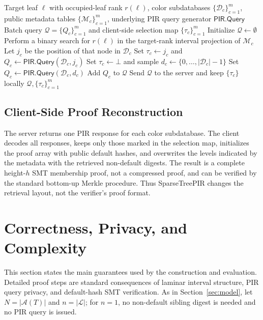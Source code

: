\begin{algorithm}[H]
\caption{Online query generation: one PIR subquery per color}
\label{alg:query}
\begin{algorithmic}[1]
\Require Target leaf $\ell$ with occupied-leaf rank $r(\ell)$, color subdatabases $\{\mathcal{D}_c\}_{c=1}^{m}$, public metadata tables $\{\mathcal{M}_c\}_{c=1}^{m}$, underlying PIR query generator $\mathsf{PIR.Query}$
\Ensure Batch query $\mathcal{Q}=\{Q_c\}_{c=1}^{m}$ and client-side selection map $\{\tau_c\}_{c=1}^{m}$
\State Initialize $\mathcal{Q}\gets\emptyset$
  \State Perform a binary search for $r(\ell)$ in the target-rank interval projection of $\mathcal{M}_c$
    \State Let $j_c$ be the position of that node in $\mathcal{D}_c$
    \State Set $\tau_c\gets j_c$ and $Q_c\gets\mathsf{PIR.Query}(\mathcal{D}_c,j_c)$
  \Else
    \State Set $\tau_c\gets \bot$ and sample $d_c\leftarrow\{0,\ldots,|\mathcal{D}_c|-1\}$
    \State Set $Q_c\gets\mathsf{PIR.Query}(\mathcal{D}_c,d_c)$
  \EndIf
  \State Add $Q_c$ to $\mathcal{Q}$
\EndFor
\State Send $\mathcal{Q}$ to the server and keep $\{\tau_c\}$ locally
\State \Return $\mathcal{Q},\{\tau_c\}_{c=1}^{m}$
\end{algorithmic}
\end{algorithm}
\vspace{-0.5em}

\subsection{Client-Side Proof Reconstruction}

The server returns one PIR response for each color subdatabase. The client decodes all responses, keeps only those marked in the selection map, initializes the proof array with public default hashes, and overwrites the levels indicated by the metadata with the retrieved non-default digests. The result is a complete height-$h$ SMT membership proof, not a compressed proof, and can be verified by the standard bottom-up Merkle procedure. Thus SparseTreePIR changes the retrieval layout, not the verifier's proof format.

\section{Correctness, Privacy, and Complexity}
\label{sec:correctness}

This section states the main guarantees used by the construction and evaluation. Detailed proof steps are standard consequences of laminar interval structure, PIR query privacy, and default-hash SMT verification. As in Section~\ref{sec:model}, let $N=|\mathcal{A}(T)|$ and $n=|\mathcal{L}|$; for $n=1$, no non-default sibling digest is needed and no PIR query is issued.

